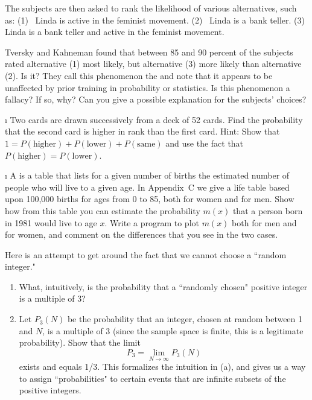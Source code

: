 \begin{LJSItem}
The subjects are then asked to rank the likelihood of various alternatives,
such as:\hfill\break
\indent(1)~ Linda is active in the feminist movement.\hfill\break
\indent(2)~ Linda is a bank teller.\hfill\break
\indent(3)~ Linda is a bank teller and active in the feminist
movement.\hfill\break

\noindent Tversky and Kahneman found that 
between 85 and 90 percent of the subjects rated
alternative (1) most likely, but alternative (3) more likely than alternative
(2).  Is it?  They call this phenomenon the  and
note that it appears to be unaffected by prior training in probability or
statistics.  Is this phenomenon a fallacy?  If so, why? Can you give a possible
explanation for the subjects' choices?

\i\label{exer 1.2.25} Two cards are drawn successively from a deck of 52
cards.  Find the
probability that the second card is higher in rank than the first card.  \emx
{Hint}: Show that $1 = P(\mbox{higher}) + P(\mbox{lower}) + P(\mbox{same})$
and use the fact that $P(\mbox{higher}) = P(\mbox{lower})$.

\i\label{exer 1.2.26} A  is a table that lists for a
given number of births the estimated number of people who will live to a
given age.  In Appendix~C we give a life table based upon 100{,}000
births for ages from 0 to 85, both for women and for men.  Show how from this 
table you can estimate the probability $m(x)$ that a person born in 1981 
would live to age $x$.  Write a program to plot $m(x)$ both for men and for women, 
and comment on the differences that you see in the two cases.

\istar\label{exer 1.2.27} Here is an attempt to get around the fact that we
cannot 
choose a ``random integer."
\begin{enumerate}
\item What, intuitively, is the probability that a ``randomly chosen"
positive integer is a multiple of 3?

\item Let $P_3(N)$ be the probability that an integer, chosen at random
between 1 and $N$, is a multiple of 3 (since the sample space is finite, this
is a legitimate probability).  Show that the limit
$$
P_3 = \lim_{N \to \infty} P_3(N)
$$
exists and equals 1/3.  This formalizes the intuition in
(a), and gives us a way to assign ``probabilities" to
certain events that are infinite subsets of the positive integers.


\end{enumerate}
\end{LJSItem}

